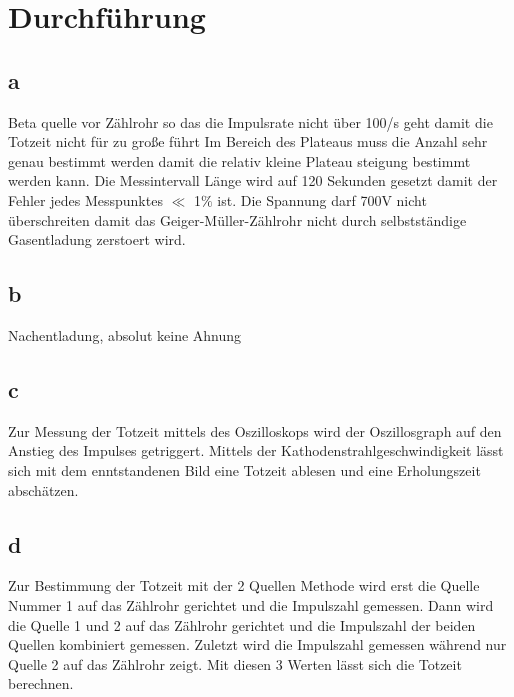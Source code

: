 \newpage
\section{Durchführung}

\subsection{a}
Beta quelle vor Zählrohr so das die Impulsrate nicht über 100/s geht damit die Totzeit nicht für zu große führt
Im Bereich des Plateaus muss die Anzahl sehr genau bestimmt werden damit die relativ kleine Plateau steigung bestimmt werden kann.
Die Messintervall Länge wird auf 120 Sekunden gesetzt damit der Fehler jedes Messpunktes $\ll$ 1$\percent$ ist.
Die Spannung darf 700V nicht überschreiten damit das Geiger-Müller-Zählrohr nicht durch selbstständige Gasentladung zerstoert wird.

\subsection{b}

Nachentladung, 
absolut keine Ahnung

\subsection{c}

Zur Messung der Totzeit mittels des Oszilloskops wird der Oszillosgraph auf den Anstieg des Impulses getriggert.
Mittels der Kathodenstrahlgeschwindigkeit lässt sich mit dem enntstandenen Bild eine Totzeit ablesen und eine Erholungszeit abschätzen.

\subsection{d}
Zur Bestimmung der Totzeit mit der 2 Quellen Methode wird erst die Quelle Nummer 1 auf das Zählrohr gerichtet und die Impulszahl gemessen.
Dann wird die Quelle 1 und 2 auf das Zählrohr gerichtet und die Impulszahl der beiden Quellen kombiniert gemessen. Zuletzt wird die Impulszahl gemessen 
während nur Quelle 2 auf das Zählrohr zeigt. Mit diesen 3 Werten lässt sich die Totzeit berechnen.

